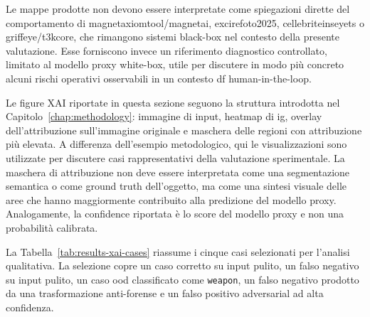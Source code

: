 Le mappe prodotte non devono essere interpretate come spiegazioni dirette del
comportamento di \gls{magnetaxiomtool}/\gls{magnetai},
\gls{excirefoto2025}, \gls{cellebriteinseyets} o
\gls{griffeye}/\gls{t3kcore}, che rimangono sistemi black-box nel contesto della
presente valutazione. Esse forniscono invece un riferimento diagnostico
controllato, limitato al modello proxy white-box, utile per discutere in modo
più concreto alcuni rischi operativi osservabili in un contesto \gls{df}
human-in-the-loop.

Le figure XAI riportate in questa sezione seguono la struttura introdotta nel
Capitolo~\ref{chap:methodology}: immagine di input, heatmap di
\gls{ig}, overlay dell'attribuzione sull'immagine originale e maschera delle
regioni con attribuzione più elevata. A differenza dell'esempio metodologico,
qui le visualizzazioni sono utilizzate per discutere casi rappresentativi della
valutazione sperimentale. La maschera di attribuzione non deve essere
interpretata come una segmentazione semantica o come ground truth dell'oggetto,
ma come una sintesi visuale delle aree che hanno maggiormente contribuito alla
predizione del modello proxy. Analogamente, la confidence riportata è lo score
del modello proxy e non una probabilità calibrata.

La Tabella~\ref{tab:results-xai-cases} riassume i cinque casi selezionati per
l'analisi qualitativa. La selezione copre un caso corretto su input pulito, un
falso negativo su input pulito, un caso \gls{ood} classificato come
\texttt{weapon}, un falso negativo prodotto da una trasformazione anti-forense e
un falso positivo adversarial ad alta confidenza.

